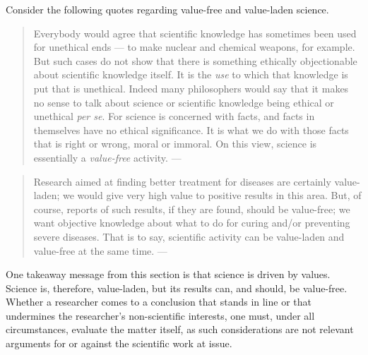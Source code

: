 \documentclass[
]{book}
\begin{document}
Consider the following quotes regarding value-free and value-laden science.

\begin{quote}
Everybody would agree that scientific knowledge has sometimes been used for unethical ends --- to make nuclear and chemical weapons, for example. But such cases do not show that there is something ethically objectionable about scientific knowledge itself. It is the \emph{use} to which that knowledge is put that is unethical. Indeed many philosophers would say that it makes no sense to talk about science or scientific knowledge being ethical or unethical \emph{per se}. For science is concerned with facts, and facts in themselves have no ethical significance. It is what we do with those facts that is right or wrong, moral or immoral. On this view, science is essentially a \emph{value-free} activity. --- \citep{okasha-pos}
\end{quote}

\begin{quote}
Research aimed at finding better treatment for diseases are certainly value-laden; we would give very high value to positive results in this area. But, of course, reports of such results, if they are found, should be value-free; we want objective knowledge about what to do for curing and/or preventing severe diseases. That is to say, scientific activity can be value-laden and value-free at the same time. --- \citep{johansson2016philosophy}
\end{quote}

One takeaway message from this section is that science is driven by values. Science is, therefore, value-laden, but its results can, and should, be value-free. Whether a researcher comes to a conclusion that stands in line or that undermines the researcher's non-scientific interests, one must, under all circumstances, evaluate the matter itself, as such considerations are not relevant arguments for or against the scientific work at issue.
\end{document}
